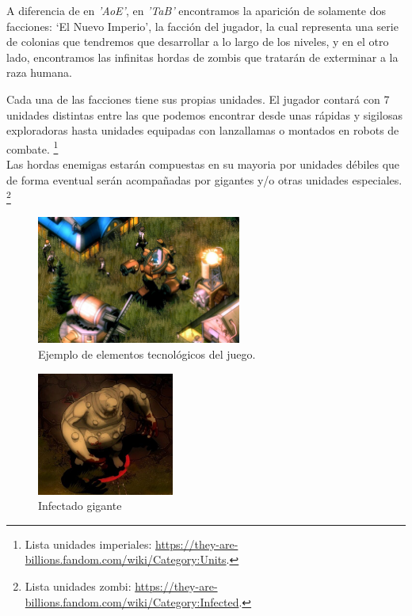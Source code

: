 A diferencia de en \textit{'\ac{AoE}'}, en \textit{'\ac{TaB}'} encontramos la aparición de solamente dos facciones:
`El Nuevo Imperio', la facción del jugador, la cual representa una 
serie de colonias que tendremos que desarrollar a lo largo de los niveles, y en el otro lado, 
encontramos las infinitas hordas de zombis que tratarán de exterminar a la raza humana.

Cada una de las facciones tiene sus propias unidades. El jugador contará con 7 unidades distintas
entre las que podemos encontrar desde unas rápidas y sigilosas exploradoras hasta unidades equipadas
con lanzallamas o montados en robots de combate. \footnote{Lista unidades imperiales: \url{https://they-are-billions.fandom.com/wiki/Category:Units}.}
\\Las hordas enemigas estarán compuestas en su mayoria por unidades débiles que de forma eventual
serán acompañadas por gigantes y/o otras unidades especiales.
\footnote{Lista unidades zombi: \url{https://they-are-billions.fandom.com/wiki/Category:Infected}.}

\begin{figure}[ht]
\centering
\includegraphics[width=0.6\textwidth]{imagenes/marco_teo/referentes/tab_2.png}
\caption{Ejemplo de elementos tecnológicos del juego.}
\label{img:tab_2}
\end{figure}

\begin{figure}[ht]
\centering
\includegraphics[width=0.4\textwidth]{imagenes/marco_teo/referentes/tab_3.png}
\caption{Infectado gigante}
\label{img:tab_3}
\end{figure}

